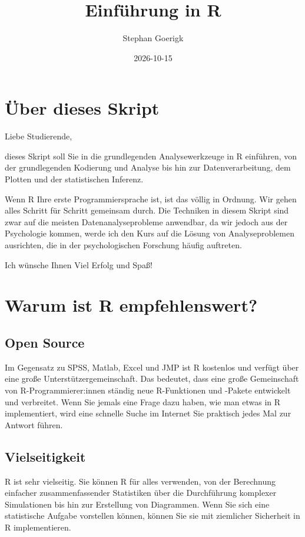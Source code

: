 \documentclass[
]{book}
\title{Einführung in R}
\author{Stephan Goerigk}
\date{2026-10-15}
\begin{document}
\maketitle

{
\setcounter{tocdepth}{1}
\tableofcontents
}
\chapter*{Über dieses Skript}\label{uxfcber-dieses-skript}

Liebe Studierende,

dieses Skript soll Sie in die grundlegenden Analysewerkzeuge in R einführen, von der grundlegenden Kodierung und Analyse bis hin zur Datenverarbeitung, dem Plotten und der statistischen Inferenz.

Wenn R Ihre erste Programmiersprache ist, ist das völlig in Ordnung. Wir gehen alles Schritt für Schritt gemeinsam durch. Die Techniken in diesem Skript sind zwar auf die meisten Datenanalyseprobleme anwendbar, da wir jedoch aus der Psychologie kommen, werde ich den Kurs auf die Lösung von Analyseproblemen ausrichten, die in der psychologischen Forschung häufig auftreten.

Ich wünsche Ihnen Viel Erfolg und Spaß!

\chapter{Warum ist R empfehlenswert?}\label{warum-ist-r-empfehlenswert}

\section{Open Source}\label{open-source}

Im Gegensatz zu SPSS, Matlab, Excel und JMP ist R kostenlos und verfügt über eine große Unterstützergemeinschaft. Das bedeutet, dass eine große Gemeinschaft von R-Programmierer:innen ständig neue R-Funktionen und -Pakete entwickelt und verbreitet. Wenn Sie jemals eine Frage dazu haben, wie man etwas in R implementiert, wird eine schnelle Suche im Internet Sie praktisch jedes Mal zur Antwort führen.

\section{Vielseitigkeit}\label{vielseitigkeit}

R ist sehr vielseitig. Sie können R für alles verwenden, von der Berechnung einfacher zusammenfassender Statistiken über die Durchführung komplexer Simulationen bis hin zur Erstellung von Diagrammen. Wenn Sie sich eine statistische Aufgabe vorstellen können, können Sie sie mit ziemlicher Sicherheit in R implementieren.
\end{document}
